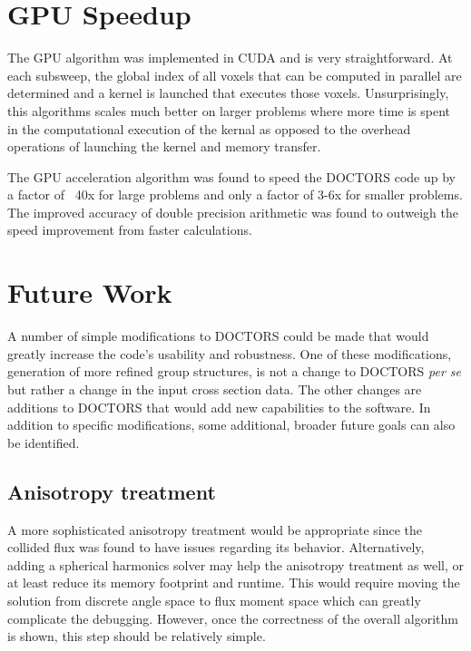 \section{GPU Speedup}

The GPU algorithm was implemented in CUDA and is very straightforward. At each subsweep, the global index of all voxels that can be computed in parallel are determined and a kernel is launched that executes those voxels. Unsurprisingly, this algorithms scales much better on larger problems where more time is spent in the computational execution of the kernal as opposed to the overhead operations of launching the kernel and memory transfer.

The GPU acceleration algorithm was found to speed the DOCTORS code up by a factor of ~40x for large problems and only a factor of 3-6x for smaller problems. The improved accuracy of double precision arithmetic was found to outweigh the speed improvement from faster calculations.

\section{Future Work}

A number of simple modifications to DOCTORS could be made that would greatly increase the code's usability and robustness. One of these modifications, generation of more refined group structures, is not a change to DOCTORS \textit{per se} but rather a change in the input cross section data. The other changes are additions to DOCTORS that would add new capabilities to the software. In addition to specific modifications, some additional, broader future goals can also be identified.

\subsection{Anisotropy treatment}
A more sophisticated anisotropy treatment would be appropriate since the collided flux was found to have issues regarding its behavior. Alternatively, adding a spherical harmonics solver may help the anisotropy treatment as well, or at least reduce its memory footprint and runtime. This would require moving the solution from discrete angle space to flux moment space which can greatly complicate the debugging. However, once the correctness of the overall algorithm is shown, this step should be relatively simple.


